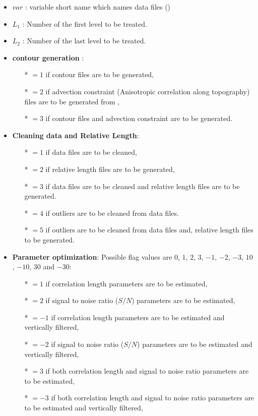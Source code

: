 {\begin{itemize}
\item $var$ :  variable short name which names data files ()
\item $L_1$ :  Number of the first level to be treated. 
\item $L_2$ :  Number of the last level to be treated.
\item {\bf contour generation} : 
              \begin{itemize}
                \item[*] $=1$ if contour files are to be generated,
                \item[*] $=2$ if advection constraint (Anisotropic correlation along topography) files are to be generated from  ,
                \item[*] $=3$ if contour files and advection constraint are to be generated.
              \end{itemize}
\item {\bf Cleaning data and Relative Length}: 
              \begin{itemize}
                \item[*] $=1$ if data files are to be cleaned,
                \item[*] $=2$ if relative length files are to be generated,
                \item[*] $=3$ if data files are to be cleaned and relative length files are to be generated.
                \item[*] $=4$ if outliers are to be cleaned from data files.
                \item[*] $=5$ if outliers are to be cleaned from data files and, relative length files to be generated.
              \end{itemize}


\item {\bf Parameter optimization}: Possible flag values are $0$, $1$, $2$, $3$, $-1$, $-2$, $-3$, $10$, $-10$, $30$ and $-30$:
              \begin{itemize}
                \item[*] $=1$ if correlation length parameters are to be estimated,
                \item[*] $=2$ if signal to noise ratio ($S/N$) parameters are to be estimated,
                \item[*] $=-1$ if correlation length parameters are to be estimated and vertically filtered,
                \item[*] $=-2$ if signal to noise ratio ($S/N$) parameters are to be estimated and vertically filtered,
                \item[*] $=3$ if both  correlation length and  signal to noise ratio parameters are to be estimated,
                \item[*] $=-3$ if both  correlation length and  signal to noise ratio parameters are to be estimated and vertically filtered,


\end{itemize}
\end{itemize}}
